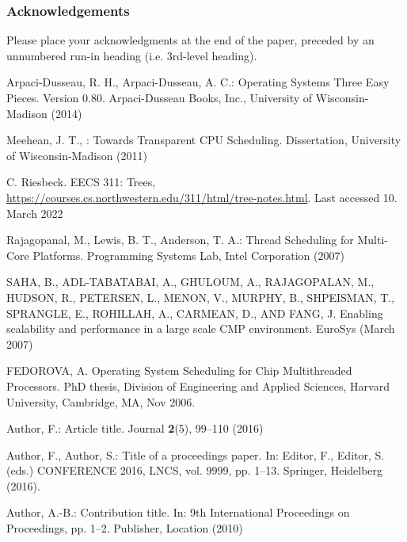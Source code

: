 \documentclass[runningheads]{llncs}
\begin{document}
\subsubsection{Acknowledgements} Please place your acknowledgments at
the end of the paper, preceded by an unnumbered run-in heading (i.e.
3rd-level heading).

%
%

 
\newpage

\begin{thebibliography}{8}

Arpaci-Dusseau, R. H., Arpaci-Dusseau, A. C.: Operating Systems Three Easy Pieces. Version 0.80. Arpaci-Dusseau Books, Inc.,
University of Wisconsin-Madison (2014)

Meehean, J. T., : Towards Transparent CPU Scheduling. Dissertation,
University of Wisconsin-Madison (2011)

C. Riesbeck. EECS 311: Trees, \url{https://courses.cs.northwestern.edu/311/html/tree-notes.html}. Last accessed 10. March 2022

Rajagopanal, M., Lewis, B. T., Anderson, T. A.: Thread Scheduling for Multi-Core Platforms. Programming Systems Lab, Intel Corporation (2007)

SAHA, B., ADL-TABATABAI, A., GHULOUM, A., RAJAGOPALAN,
M., HUDSON, R., PETERSEN, L., MENON, V.,
MURPHY, B., SHPEISMAN, T., SPRANGLE, E., ROHILLAH, A.,
CARMEAN, D., AND FANG, J. Enabling scalability and performance
in a large scale CMP environment. EuroSys (March 2007)

FEDOROVA, A. Operating System Scheduling for Chip Multithreaded
Processors. PhD thesis, Division of Engineering and
Applied Sciences, Harvard University, Cambridge, MA, Nov
2006.

Author, F.: Article title. Journal \textbf{2}(5), 99--110 (2016)

Author, F., Author, S.: Title of a proceedings paper. In: Editor,
F., Editor, S. (eds.) CONFERENCE 2016, LNCS, vol. 9999, pp. 1--13.
Springer, Heidelberg (2016). 

Author, A.-B.: Contribution title. In: 9th International Proceedings
on Proceedings, pp. 1--2. Publisher, Location (2010)
\end{thebibliography}
\end{document}
